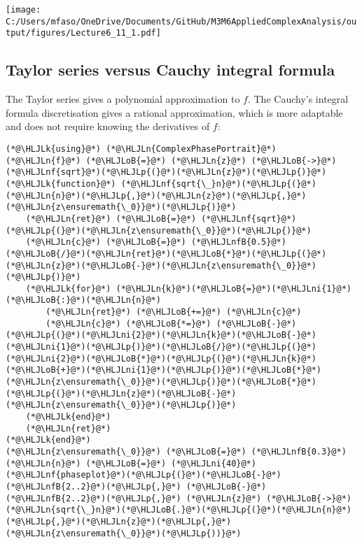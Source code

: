 \documentclass[12pt,landscape]{article}
\newcommand{\HLJLk}[1]{\textcolor[RGB]{148,91,176}{\textbf{#1}}}
\newcommand{\HLJLn}[1]{#1}
\newcommand{\HLJLnf}[1]{\textcolor[RGB]{66,102,213}{#1}}
\newcommand{\HLJLnfB}[1]{\textcolor[RGB]{59,151,46}{#1}}
\newcommand{\HLJLni}[1]{\textcolor[RGB]{59,151,46}{#1}}
\newcommand{\HLJLoB}[1]{\textcolor[RGB]{102,102,102}{\textbf{#1}}}
\newcommand{\HLJLp}[1]{#1}
\def\cent#1{\begin{center}#1\end{center} }
\begin{document}
{\cent{\texttt{[image: C:/Users/mfaso/OneDrive/Documents/GitHub/M3M6AppliedComplexAnalysis/output/figures/Lecture6\_11\_1.pdf]}}

\subsection{Taylor series versus Cauchy integral formula}
The Taylor series gives a polynomial approximation to $f$. The Cauchy's integral formula discretisation gives a rational approximation, which is more adaptable and does not require knowing the derivatives of $f$:


\begin{lstlisting}
(*@\HLJLk{using}@*) (*@\HLJLn{ComplexPhasePortrait}@*)
(*@\HLJLn{f}@*) (*@\HLJLoB{=}@*) (*@\HLJLn{z}@*) (*@\HLJLoB{->}@*) (*@\HLJLnf{sqrt}@*)(*@\HLJLp{(}@*)(*@\HLJLn{z}@*)(*@\HLJLp{)}@*)
(*@\HLJLk{function}@*) (*@\HLJLnf{sqrt{\_}n}@*)(*@\HLJLp{(}@*)(*@\HLJLn{n}@*)(*@\HLJLp{,}@*)(*@\HLJLn{z}@*)(*@\HLJLp{,}@*)(*@\HLJLn{z\ensuremath{\_0}}@*)(*@\HLJLp{)}@*)
    (*@\HLJLn{ret}@*) (*@\HLJLoB{=}@*) (*@\HLJLnf{sqrt}@*)(*@\HLJLp{(}@*)(*@\HLJLn{z\ensuremath{\_0}}@*)(*@\HLJLp{)}@*)
    (*@\HLJLn{c}@*) (*@\HLJLoB{=}@*) (*@\HLJLnfB{0.5}@*)(*@\HLJLoB{/}@*)(*@\HLJLn{ret}@*)(*@\HLJLoB{*}@*)(*@\HLJLp{(}@*)(*@\HLJLn{z}@*)(*@\HLJLoB{-}@*)(*@\HLJLn{z\ensuremath{\_0}}@*)(*@\HLJLp{)}@*)
    (*@\HLJLk{for}@*) (*@\HLJLn{k}@*)(*@\HLJLoB{=}@*)(*@\HLJLni{1}@*)(*@\HLJLoB{:}@*)(*@\HLJLn{n}@*)
        (*@\HLJLn{ret}@*) (*@\HLJLoB{+=}@*) (*@\HLJLn{c}@*)
        (*@\HLJLn{c}@*) (*@\HLJLoB{*=}@*) (*@\HLJLoB{-}@*)(*@\HLJLp{(}@*)(*@\HLJLni{2}@*)(*@\HLJLn{k}@*)(*@\HLJLoB{-}@*)(*@\HLJLni{1}@*)(*@\HLJLp{)}@*)(*@\HLJLoB{/}@*)(*@\HLJLp{(}@*)(*@\HLJLni{2}@*)(*@\HLJLoB{*}@*)(*@\HLJLp{(}@*)(*@\HLJLn{k}@*)(*@\HLJLoB{+}@*)(*@\HLJLni{1}@*)(*@\HLJLp{)}@*)(*@\HLJLoB{*}@*)(*@\HLJLn{z\ensuremath{\_0}}@*)(*@\HLJLp{)}@*)(*@\HLJLoB{*}@*)(*@\HLJLp{(}@*)(*@\HLJLn{z}@*)(*@\HLJLoB{-}@*)(*@\HLJLn{z\ensuremath{\_0}}@*)(*@\HLJLp{)}@*)
    (*@\HLJLk{end}@*)
    (*@\HLJLn{ret}@*)
(*@\HLJLk{end}@*)
(*@\HLJLn{z\ensuremath{\_0}}@*) (*@\HLJLoB{=}@*) (*@\HLJLnfB{0.3}@*)
(*@\HLJLn{n}@*) (*@\HLJLoB{=}@*) (*@\HLJLni{40}@*)
(*@\HLJLnf{phaseplot}@*)(*@\HLJLp{(}@*)(*@\HLJLoB{-}@*)(*@\HLJLnfB{2..2}@*)(*@\HLJLp{,}@*) (*@\HLJLoB{-}@*)(*@\HLJLnfB{2..2}@*)(*@\HLJLp{,}@*) (*@\HLJLn{z}@*) (*@\HLJLoB{->}@*) (*@\HLJLn{sqrt{\_}n}@*)(*@\HLJLoB{.}@*)(*@\HLJLp{(}@*)(*@\HLJLn{n}@*)(*@\HLJLp{,}@*)(*@\HLJLn{z}@*)(*@\HLJLp{,}@*)(*@\HLJLn{z\ensuremath{\_0}}@*)(*@\HLJLp{))}@*)
\end{lstlisting}

}
\end{document}
